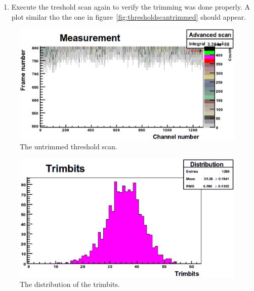 \begin{enumerate}
Click on \textit{Trim} to start the noise trimming process. After the trimming has finished look at the plot and the distribution of the trim bits. The distribution should be around 32$\pm$5 and should look gaussian. An example distribution is shown in figure~\ref{fig:trimdistribution} and an example plot in~\ref{fig:trimplot}. If the distribution is too much off center change the counts/pixel, if it is too narrow reduce the resolution (set it to 3), if it is too wide increase it (set it to 5). Make sure not too many channels have a trim value of 0 or 63.
\item Execute the treshold scan again to verify the trimming was done properly. A plot similar tho the one in figure~\ref{fig:thresholdscantrimmed} should appear.
\end{enumerate}

\begin{figure}
\begin{center}
\includegraphics[width=\textwidth]{images/noise_thresholdscanuntrimmed}
\end{center}
\caption{The untrimmed threshold scan.}\label{fig:thresholdscanuntrimmed}
\end{figure}

\begin{figure}
\begin{center}
\includegraphics[width=\textwidth]{images/trimbitdistribution}
\end{center}
\caption{The distribution of the trimbits.}\label{fig:trimdistribution}
\end{figure}

